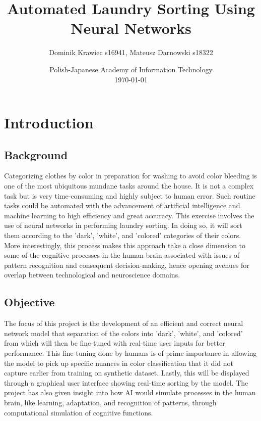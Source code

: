 \documentclass{article}
\title{Automated Laundry Sorting Using Neural Networks}
\author{Dominik Krawiec s16941, Mateusz Darnowski s18322}
\date{Polish-Japanese Academy of Information Technology\\\today}
\begin{document}
\pretitle{\vspace*{\fill}\begin{center}\Huge\bfseries}
\posttitle{\end{center}\vspace*{\fill}} 
\preauthor{\begin{center}\large} 
\postauthor{\end{center}} 
\predate{\begin{center}\large} 
\postdate{\end{center}\vspace*{\fill}} 



\maketitle
\newpage

\tableofcontents
\newpage



\section{Introduction}

\subsection{Background}
Categorizing clothes by color in preparation for washing to avoid color bleeding is one of the most ubiquitous mundane tasks around the house. It is not a complex task but is very time-consuming and highly subject to human error. Such routine tasks could be automated with the advancement of artificial intelligence and machine learning to high efficiency and great accuracy. This exercise involves the use of neural networks in performing laundry sorting. In doing so, it will sort them according to the 'dark', 'white', and 'colored' categories of their colors. More interestingly, this process makes this approach take a close dimension to some of the cognitive processes in the human brain associated with issues of pattern recognition and consequent decision-making, hence opening avenues for overlap between technological and neuroscience domains.
\subsection{Objective}
The focus of this project is the development of an efficient and correct neural network model that separation of the colors into 'dark', 'white', and 'colored' from which will then be fine-tuned with real-time user inputs for better performance. This fine-tuning done by humans is of prime importance in allowing the model to pick up specific nuances in color classification that it did not capture earlier from training on synthetic dataset. Lastly, this will be displayed through a graphical user interface showing real-time sorting by the model. The project has also given insight into how AI would simulate processes in the human brain, like learning, adaptation, and recognition of patterns, through computational simulation of cognitive functions.
\end{document}
